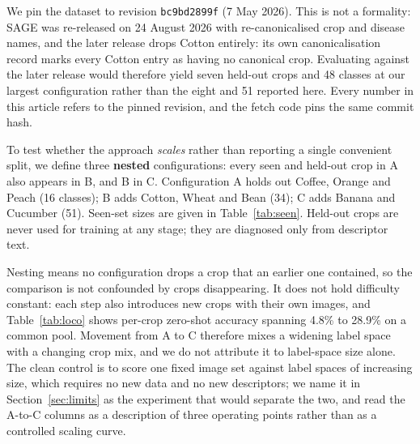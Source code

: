 \documentclass[a4paper,fleqn]{cas-dc}
\begin{document}
We pin the dataset to revision \texttt{bc9bd2899f} (7 May 2026). This is not a formality: SAGE was
re-released on 24 August 2026 with re-canonicalised crop and disease names, and the later release
drops Cotton entirely: its own canonicalisation record marks every Cotton entry as having no
canonical crop. Evaluating against the later release would therefore yield seven held-out crops and
48 classes at our largest configuration rather than the eight and 51 reported here. Every number in
this article refers to the pinned revision, and the fetch code pins the same commit hash.

To test whether the approach \emph{scales} rather than reporting a single convenient split, we define
three \textbf{nested} configurations: every seen and held-out crop in A also appears in B, and B in
C. Configuration A holds out Coffee, Orange and Peach (16 classes); B adds Cotton, Wheat and Bean
(34); C adds Banana and Cucumber (51). Seen-set sizes are given in Table~\ref{tab:seen}. Held-out crops
are never used for training at any stage; they are diagnosed only from descriptor text.

Nesting means no configuration drops a crop that an earlier one contained, so the comparison is
not confounded by crops disappearing. It does not hold difficulty constant: each step also
introduces new crops with their own images, and Table~\ref{tab:loco} shows per-crop zero-shot
accuracy spanning 4.8\% to 28.9\% on a common pool. Movement from A to C therefore mixes a
widening label space with a changing crop mix, and we do not attribute it to label-space size
alone. The clean control is to score one fixed image set against label spaces of increasing size,
which requires no new data and no new descriptors; we name it in Section~\ref{sec:limits} as the
experiment that would separate the two, and read the A-to-C columns as a description of three
operating points rather than as a controlled scaling curve.
\end{document}
